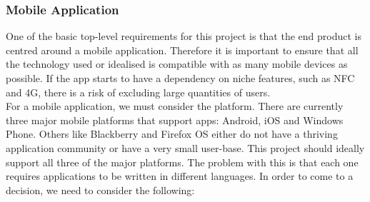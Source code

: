 \subsubsection{Mobile Application}
One of the basic top-level requirements for this project is that the end product is centred around a mobile application.  Therefore it is important to ensure that all the technology used or idealised is compatible with as many mobile devices as possible.  If the app starts to have a dependency on niche features, such as NFC and 4G, there is a risk of excluding large quantities of users.\\
For a mobile application, we must consider the platform.  There are currently three major mobile platforms that support apps: Android, iOS and Windows Phone.  Others like Blackberry and Firefox OS either do not have a thriving application community or have a very small user-base.  This project should ideally support all three of the major platforms.  The problem with this is that each one requires applications to be written in different languages.  In order to come to a decision, we need to consider the following:
